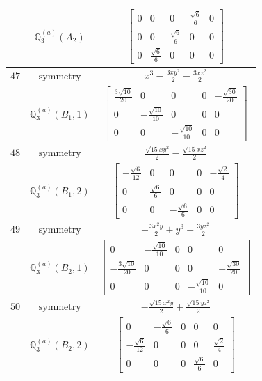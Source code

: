 \documentclass[fleqn,8pt,landscape]{jsarticle}
\begin{document}
\begin{longtable}{ccc}
$  $ & $ \mathbb{Q}_{3}^{(a)}(A_{2}) $ & $ \begin{bmatrix} 0 & 0 & 0 & \frac{\sqrt{6}}{6} & 0 \\ 0 & 0 & \frac{\sqrt{6}}{6} & 0 & 0 \\ 0 & \frac{\sqrt{6}}{6} & 0 & 0 & 0 \end{bmatrix} $ \\ \hline
$ 47 $ & $ \text{symmetry} $ & $ x^{3} - \frac{3 x y^{2}}{2} - \frac{3 x z^{2}}{2} $ \\
$  $ & $ \mathbb{Q}_{3}^{(a)}(B_{1},1) $ & $ \begin{bmatrix} \frac{3 \sqrt{10}}{20} & 0 & 0 & 0 & - \frac{\sqrt{30}}{20} \\ 0 & - \frac{\sqrt{10}}{10} & 0 & 0 & 0 \\ 0 & 0 & - \frac{\sqrt{10}}{10} & 0 & 0 \end{bmatrix} $ \\ \hline
$ 48 $ & $ \text{symmetry} $ & $ \frac{\sqrt{15} x y^{2}}{2} - \frac{\sqrt{15} x z^{2}}{2} $ \\
$  $ & $ \mathbb{Q}_{3}^{(a)}(B_{1},2) $ & $ \begin{bmatrix} - \frac{\sqrt{6}}{12} & 0 & 0 & 0 & - \frac{\sqrt{2}}{4} \\ 0 & \frac{\sqrt{6}}{6} & 0 & 0 & 0 \\ 0 & 0 & - \frac{\sqrt{6}}{6} & 0 & 0 \end{bmatrix} $ \\ \hline
$ 49 $ & $ \text{symmetry} $ & $ - \frac{3 x^{2} y}{2} + y^{3} - \frac{3 y z^{2}}{2} $ \\
$  $ & $ \mathbb{Q}_{3}^{(a)}(B_{2},1) $ & $ \begin{bmatrix} 0 & - \frac{\sqrt{10}}{10} & 0 & 0 & 0 \\ - \frac{3 \sqrt{10}}{20} & 0 & 0 & 0 & - \frac{\sqrt{30}}{20} \\ 0 & 0 & 0 & - \frac{\sqrt{10}}{10} & 0 \end{bmatrix} $ \\ \hline
$ 50 $ & $ \text{symmetry} $ & $ - \frac{\sqrt{15} x^{2} y}{2} + \frac{\sqrt{15} y z^{2}}{2} $ \\
$  $ & $ \mathbb{Q}_{3}^{(a)}(B_{2},2) $ & $ \begin{bmatrix} 0 & - \frac{\sqrt{6}}{6} & 0 & 0 & 0 \\ - \frac{\sqrt{6}}{12} & 0 & 0 & 0 & \frac{\sqrt{2}}{4} \\ 0 & 0 & 0 & \frac{\sqrt{6}}{6} & 0 \end{bmatrix} $ \\ \hline

\end{longtable}
\end{document}
